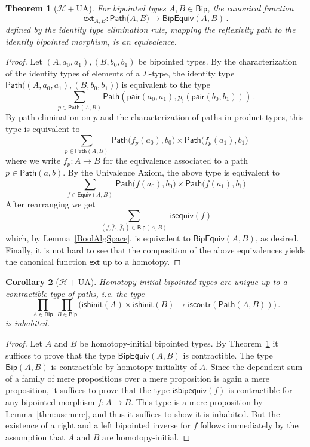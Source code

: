 \documentclass[10pt,a4paper,oneside,reqno]{amsart}
\numberwithin{equation}{section}
\theoremstyle{mythm}
\newtheorem{theorem}{Theorem}[section]
\newtheorem{corollary}[theorem]{Corollary}
\theoremstyle{mydef}
\theoremstyle{myrmk}
\newcommand{\co}{\colon}
\newcommand{\Hint}{\mathcal{H}}
\newcommand{\iscontr}{\mathsf{iscontr}}
\newcommand{\isequiv}{\mathsf{isequiv}}
\newcommand{\ext}{\mathsf{ext}}
\newcommand{\pair}{\mathsf{pair}}
\newcommand{\Id}{\mathsf{Path}}
\newcommand{\Bip}{\mathsf{Bip}}
\newcommand{\BipHom}{\mathsf{Bip}}
\newcommand{\isbipequiv}{\mathsf{isbipequiv}}
\newcommand{\BipEquiv}{\mathsf{BipEquiv}}
\newcommand{\ishinitial}{\mathsf{ishinit}}
\begin{document}
\begin{theorem}[$\Hint + \mathrm{UA}$] \label{thm:bipunivalence}
For bipointed types $A, B \in \Bip$, the canonical function
\[ 
\ext_{A,B} \co \Id \big(A,B\big) \to  \BipEquiv(A,B) \, .
\] 
defined by the identity type elimination rule, mapping the reflexivity path to the identity bipointed morphism, 
is an equivalence.
\end{theorem} 

\begin{proof} 
Let $ (A,a_0,a_1), (B,b_0,b_1)$ be bipointed types. By the characterization of the identity types
of  elements of a $\Sigma$-type, the 
identity type $\Id\big( (A,a_0,a_1),  (B,b_0,b_1)\big)$ is equivalent to  the type
\[
\sum_{p \in \Id(A,B)} \Id(\pair(a_0,a_1),  p_{!}(\pair(b_0,b_1))) \, .
\]
By path elimination on $p$ and the characterization of paths in product types, this type is equivalent to
\[ 
\sum_{p \in \Id(A,B)} \, \Id \big( f_p(a_0),  b_0\big) \times \Id \big( f_p(a_1) , b_1)
 \]
where we write $f_p \co A \to B$ for the equivalence associated to a path $p \in \Id(a,b)$.  By the Univalence Axiom,
the above type is equivalent to
\[ 
\sum_{f \in \mathsf{Equiv}(A,B)} \, \Id \big( f(a_0),  b_0\big) \times \Id \big( f(a_1) , b_1\big) \]
After rearranging we get
\[
\sum_{(f, \bar{f}_0, \bar{f}_1) \in \BipHom(A,B)} \, \isequiv(f)
\]
which, by Lemma~\ref{BoolAlgSpace}, is equivalent to $\BipEquiv(A,B)$, as desired. Finally, it is not hard to see that the composition of the above equivalences yields the canonical function $\ext$ up to a homotopy.
\end{proof} 

\begin{corollary}[$\Hint + \mathrm{UA}$] \label{BoolHInitIso} 
Homotopy-initial bipointed types are unique up to a contractible type of paths, i.e. the type
\[ 
\prod_{A \in \Bip} \, \prod_{ B \in \Bip}
\big( \ishinitial(A) \times \ishinitial(B) \to \iscontr(\Id(A,B)) \big) \, .
\] 
is inhabited.
\end{corollary}

\begin{proof} Let $A$ and $B$ be homotopy-initial bipointed types. 
By Theorem~\ref{thm:bipunivalence} it suffices to prove that the type $\BipEquiv(A,B)$ is contractible. The type 
$\BipHom( A, B)$ is contractible by homotopy-initiality of $A$. Since the dependent sum of a family of mere propositions over a mere proposition is again a mere proposition, it suffices to prove that the type $\isbipequiv(f)$ is contractible for any bipointed morphism $f \co A \to B$. This type is a mere proposition by Lemma~\ref{thm:usemere}, and thus it suffices to show it is inhabited. But the existence of a right and a left bipointed inverse for $f$ follows immediately
by the assumption that $A$ and $B$ are homotopy-initial.
\end{proof}
\end{document}
